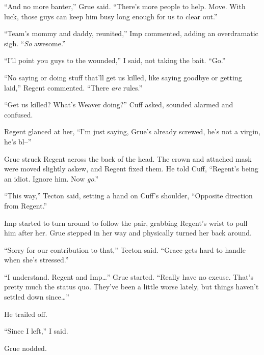 ``And no more banter,'' Grue said.  ``There's more people to help.  Move.  With luck, those guys can keep him busy long enough for us to clear out.''



``Team's mommy and daddy, reunited,'' Imp commented, adding an overdramatic sigh. ``\emph{So }awesome.''



``I'll point you guys to the wounded,'' I said, not taking the bait.  ``Go.''



``No saying or doing stuff that'll get us killed, like saying goodbye or getting laid,'' Regent commented.  ``There \emph{are} rules.''



``Get us killed?  What's Weaver doing?'' Cuff asked, sounded alarmed and confused.



Regent glanced at her, ``I'm just saying, Grue's already screwed, he's not a virgin, he's bl--''



Grue struck Regent across the back of the head.  The crown and attached mask were moved slightly askew, and Regent fixed them.  He told Cuff, ``Regent's being an idiot.  Ignore him.  Now \emph{go}.''



``This way,'' Tecton said, setting a hand on Cuff's shoulder, ``Opposite direction from Regent.''



Imp started to turn around to follow the pair, grabbing Regent's wrist to pull him after her.  Grue stepped in her way and physically turned her back around.



``Sorry for our contribution to that,'' Tecton said.  ``Grace gets hard to handle when she's stressed.''



``I understand.  Regent and Imp\ldots'' Grue started.  ``Really have no excuse.  That's pretty much the status quo.  They've been a little worse lately, but things haven't settled down since\ldots''



He trailed off.



``Since I left,'' I said.



Grue nodded.



